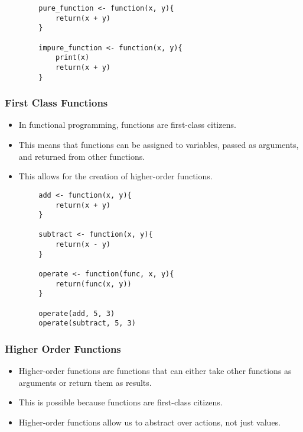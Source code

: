\documentclass[serif, 9pt, aspectratio=32]{beamer}
\begin{document}
\begin{frame}[fragile]
    \begin{lstlisting}
        pure_function <- function(x, y){
            return(x + y)
        }

        impure_function <- function(x, y){
            print(x)
            return(x + y)
        }
    \end{lstlisting}
\end{frame}

\begin{frame}
    \centering
    \frametitle{First Class Functions}
    \begin{itemize}
        \setlength{\itemsep}{2em}
        \item In functional programming, functions are first-class citizens.
        \item This means that functions can be assigned to variables, passed as arguments, and returned from other functions.
        \item This allows for the creation of higher-order functions.
    \end{itemize}
\end{frame}

\begin{frame}[fragile]
    \begin{lstlisting}
        add <- function(x, y){
            return(x + y)
        }

        subtract <- function(x, y){
            return(x - y)
        }

        operate <- function(func, x, y){
            return(func(x, y))
        }

        operate(add, 5, 3)
        operate(subtract, 5, 3)
    \end{lstlisting}
\end{frame}

\begin{frame}
    \centering
    \frametitle{Higher Order Functions}
    \begin{itemize}
        \setlength{\itemsep}{2em}
        \item Higher-order functions are functions that can either take other functions as arguments or return them as results.
        \item This is possible because functions are first-class citizens.
        \item Higher-order functions allow us to abstract over actions, not just values.
    \end{itemize}
\end{frame}
\end{document}

